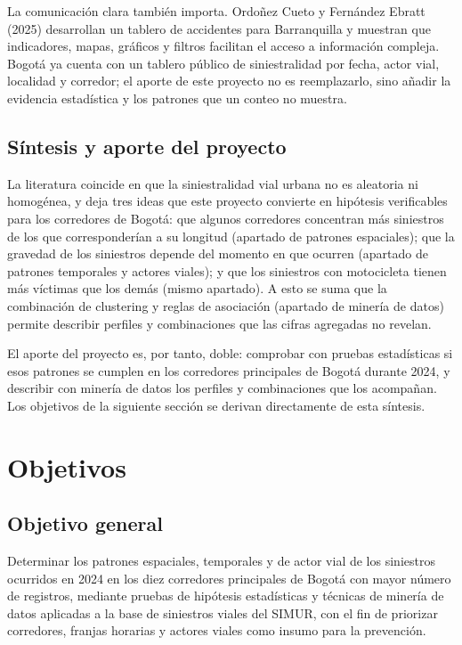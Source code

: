 \documentclass[12pt,letterpaper]{article}
\begin{document}
La comunicación clara también importa. Ordoñez Cueto y Fernández Ebratt
(2025) desarrollan un tablero de accidentes para Barranquilla y muestran
que indicadores, mapas, gráficos y filtros facilitan el acceso a
información compleja. Bogotá ya cuenta con un tablero público de
siniestralidad por fecha, actor vial, localidad y corredor; el aporte de
este proyecto no es reemplazarlo, sino añadir la evidencia estadística y
los patrones que un conteo no muestra.

\hypertarget{suxedntesis-y-aporte-del-proyecto}{%
\subsection{Síntesis y aporte del
proyecto}\label{suxedntesis-y-aporte-del-proyecto}}

La literatura coincide en que la siniestralidad vial urbana no es
aleatoria ni homogénea, y deja tres ideas que este proyecto convierte en
hipótesis verificables para los corredores de Bogotá: que algunos
corredores concentran más siniestros de los que corresponderían a su
longitud (apartado de patrones espaciales); que la gravedad de los siniestros depende del
momento en que ocurren (apartado de patrones temporales y actores viales); y que los siniestros con
motocicleta tienen más víctimas que los demás (mismo apartado). A esto se
suma que la combinación de clustering y reglas de asociación (apartado de
minería de datos) permite describir perfiles y combinaciones que las cifras agregadas
no revelan.

El aporte del proyecto es, por tanto, doble: comprobar con pruebas
estadísticas si esos patrones se cumplen en los corredores principales
de Bogotá durante 2024, y describir con minería de datos los perfiles y
combinaciones que los acompañan. Los objetivos de la siguiente sección
se derivan directamente de esta síntesis.

\clearpage
\hypertarget{objetivos}{%
\section{Objetivos}\label{objetivos}}

\hypertarget{objetivo-general}{%
\subsection{Objetivo general}\label{objetivo-general}}

Determinar los patrones espaciales, temporales y de actor vial de los
siniestros ocurridos en 2024 en los diez corredores principales de
Bogotá con mayor número de registros, mediante pruebas de hipótesis
estadísticas y técnicas de minería de datos aplicadas a la base de
siniestros viales del SIMUR, con el fin de priorizar corredores, franjas
horarias y actores viales como insumo para la prevención.
\end{document}
